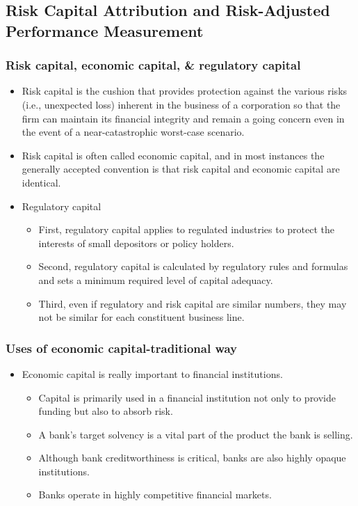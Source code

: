 


\subsection{Risk Capital Attribution and Risk-Adjusted Performance Measurement}

\subsubsection{Risk capital, economic capital, \& regulatory capital}

\begin{itemize}
\item Risk capital is the cushion that provides protection against the various risks (i.e., unexpected loss) inherent in the business of a corporation so that the firm can maintain its financial integrity and remain a going concern even in the event of a near-catastrophic worst-case scenario.
\item Risk capital is often called economic capital, and in most instances the generally accepted convention is that risk capital and economic capital are identical.
\item Regulatory capital
    \begin{itemize}
    \item First, regulatory capital applies to regulated industries to protect the interests of small depositors or policy holders.
    \item Second, regulatory capital is calculated by regulatory rules and formulas and sets a minimum required level of capital adequacy.
    \item Third, even if regulatory and risk capital are similar numbers, they may not be similar for each constituent business line.
    \end{itemize}
\end{itemize}



\subsubsection{Uses of economic capital-traditional way}
\begin{itemize}
\item Economic capital is really important to financial institutions.
    \begin{itemize}
    \item Capital is primarily used in a financial institution not only
    to provide funding but also to absorb risk.
    \item A bank's target solvency is a vital part of the product the
    bank is selling.
    \item Although bank creditworthiness is critical, banks are also
    highly opaque institutions.
    \item Banks operate in highly competitive financial markets.
    \end{itemize}
\end{itemize}



